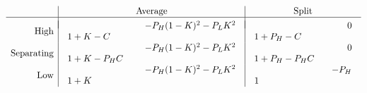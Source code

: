 \documentclass[a4paper,10pt]{article}
\numberwithin{equation}{section}
\begin{document}
\begin{table}[h]
\begin{center}
\[
\begin{array}{r|c|c}
& \text{Average} & \text{Split}\\
\hline
&&\\[-.3cm]
 \text{High} & 
\begin{array}{ll}
\hspace{2.6cm} & -P_H (1-K)^2-P_L K^2 \\
 1+K-C& 
\end{array}
 & 
\begin{array}{ll}
\hspace{3.2cm} & 0 \\
 1+P_H-C& 
\end{array}
\\
 \text{Separating} & 
\begin{array}{ll}
\hspace{2.6cm} & -P_H (1-K)^2-P_L K^2 \\
 1+K- P_H C & 
\end{array}
 & 
\begin{array}{ll}
\hspace{3.2cm} & 0 \\
1+P_H-P_H C & 
\end{array}
 \\
\text{Low} & 
\begin{array}{ll}
\hspace{2.6cm} & -P_H (1-K)^2-P_L K^2 \\
 1+K &
\end{array}
 & 
\begin{array}{ll}
\hspace{2.6cm} & -P_H \\
 1 & 
\end{array}
\end{array}
\]
\end{center}
\caption{Pay-off matrix for the revelation model}
\label{tab:PayoffMatrix3D2}
\end{table}
\end{document}
